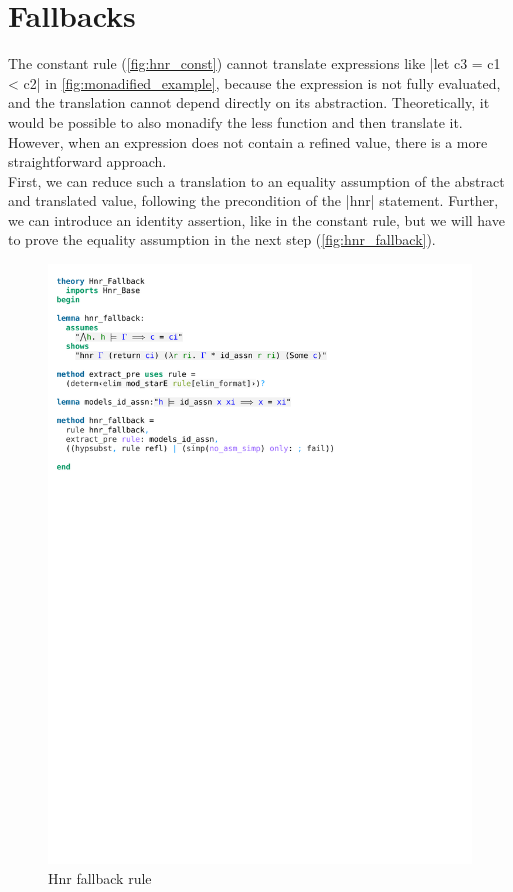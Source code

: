 \section{Fallbacks}

The constant rule (\autoref{fig:hnr_const}) cannot translate expressions like |let c3 = c1 < c2| in \autoref{fig:monadified_example}, because the expression is not fully evaluated, and the translation cannot depend directly on its abstraction. Theoretically, it would be possible to also monadify the less function and then translate it. However, when an expression does not contain a refined value, there is a more straightforward approach.\\
First, we can reduce such a translation to an equality assumption of the abstract and translated value, following the precondition of the |hnr| statement. Further, we can introduce an identity assertion, like in the constant rule, but we will have to prove the equality assumption in the next step (\autoref{fig:hnr_fallback}). 

\begin{figure}[htpb]
    \includegraphics[trim={0 24,8cm 0 2,4cm}, clip, width=1.00\textwidth]{figures/Theory_Hnr_Fallback.pdf}
    \caption[Hnr fallback rule]{Hnr fallback rule}
    \label{fig:hnr_fallback}
\end{figure}

